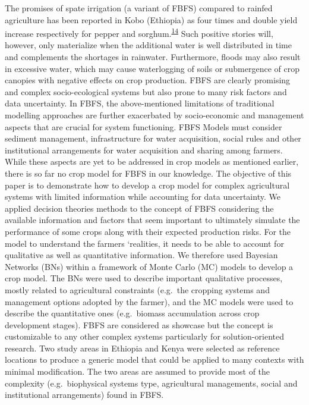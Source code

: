 \documentclass[12pt,oneside]{article}
\begin{document}
The promises of spate irrigation (a variant of FBFS) compared to rainfed
agriculture has been reported in Kobo (Ethiopia) as four times and
double yield increase respectively for pepper and
sorghum.\textsuperscript{\protect\hyperlink{ref-VanSteenbergen_et_al_2011}{14}}
Such positive stories will, however, only materialize when the
additional water is well distributed in time and complements the
shortages in rainwater. Furthermore, floods may also result in excessive
water, which may cause waterlogging of soils or submergence of crop
canopies with negative effects on crop production. FBFS are clearly
promising and complex socio-ecological systems but also prone to many
risk factors and data uncertainty. In FBFS, the above-mentioned
limitations of traditional modelling approaches are further exacerbated
by socio-economic and management aspects that are crucial for system
functioning. FBFS Models must consider sediment management,
infrastructure for water acquisition, social rules and other
institutional arrangements for water acquisition and sharing among
farmers. While these aspects are yet to be addressed in crop models as
mentioned earlier, there is so far no crop model for FBFS in our
knowledge. The objective of this paper is to demonstrate how to develop
a crop model for complex agricultural systems with limited information
while accounting for data uncertainty. We applied decision theories
methods to the concept of FBFS considering the available information and
factors that seem important to ultimately simulate the performance of
some crops along with their expected production risks. For the model to
understand the farmers `realities, it needs to be able to account for
qualitative as well as quantitative information. We therefore used
Bayesian Networks (BNs) within a framework of Monte Carlo (MC) models to
develop a crop model. The BNs were used to describe important
qualitative processes, mostly related to agricultural constraints
(e.g.~the cropping systems and management options adopted by the
farmer), and the MC models were used to describe the quantitative ones
(e.g.~biomass accumulation across crop development stages). FBFS are
considered as showcase but the concept is customizable to any other
complex systems particularly for solution-oriented research. Two study
areas in Ethiopia and Kenya were selected as reference locations to
produce a generic model that could be applied to many contexts with
minimal modification. The two areas are assumed to provide most of the
complexity (e.g.~biophysical systems type, agricultural managements,
social and institutional arrangements) found in FBFS.
\end{document}
